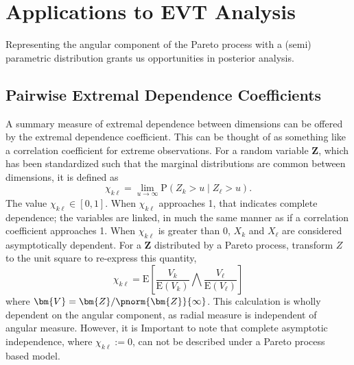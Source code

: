 \section{Applications to EVT Analysis}
\label{ref:applications}
Representing the angular component of the Pareto process with a (semi) parametric distribution grants
  us opportunities in posterior analysis.

\subsection{Pairwise Extremal Dependence Coefficients}
A summary measure of extremal dependence between dimensions can be offered by the extremal dependence
  coefficient.  This can be thought of as something like a correlation coefficient for extreme
  observations.  For a random variable $\bm{Z}$, which has been standardized such that the marginal
  distributions are common between dimensions, it is defined as
  \begin{equation}
    \chi_{k\ell} = \lim\limits_{u\to\infty}\text{P}\left(Z_k > u\mid Z_{\ell} > u\right).
  \end{equation}
  The value $\chi_{k\ell} \in [0,1]$.  When $\chi_{k\ell}$ approaches 1, that indicates complete dependence;
  the variables are linked, in much the same manner as if a correlation coefficient approaches 1.
  When $\chi_{k\ell}$ is greater than 0, $X_k$ and $X_{\ell}$ are considered asymptotically dependent.  For
  a $\bm{Z}$ distributed by a Pareto process, \cite{warner2018} transform $Z$ to the unit square to
  re-express this quantity,
  \begin{equation}
    \label{eqn:extdepcoef}
    \chi_{k\ell} = \text{E}\left[\frac{V_k}{\text{E}(V_k)}{\bigwedge}\frac{V_{\ell}}{\text{E}(V_{\ell})}\right]
  \end{equation}
  where $\bm{V} = \bm{Z} / \pnorm{\bm{Z}}{\infty}$.  This calculation is wholly dependent on the
  angular component, as radial measure is independent of angular measure.  However, it is Important
  to note that complete asymptotic independence, where $\chi_{k\ell} := 0$, can not be described
  under a Pareto process based model.

